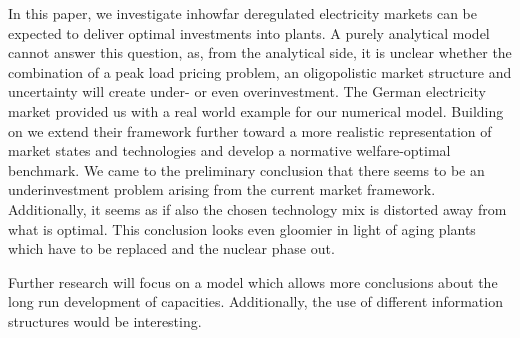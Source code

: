 In this paper, we investigate inhowfar deregulated electricity markets can be expected to deliver optimal investments into plants. A purely analytical model cannot answer this question, as, from the analytical side, it is unclear whether the combination of a peak load pricing problem, an oligopolistic market structure and uncertainty will create under- or even overinvestment. The German electricity market provided us with a real world example for our numerical model. Building on \cite{Genc2007} we extend their framework further toward a more realistic representation of market states and technologies and develop a normative welfare-optimal benchmark. We came to the preliminary conclusion that there seems to be an underinvestment problem arising from the current market framework. Additionally, it seems as if also the chosen technology mix is distorted away from what is optimal. This conclusion looks even gloomier in light of aging plants which have to be replaced and the nuclear phase out.

Further research will focus on a model which allows more conclusions about the long run development of capacities. Additionally, the use of different information structures would be interesting.



 

